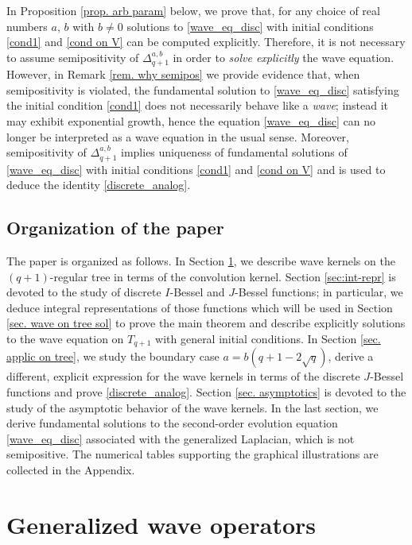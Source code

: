 \documentclass[12pt]{amsart}
\numberwithin{equation}{section}
\theoremstyle{boldremark}
\begin{document}
In Proposition \ref{prop. arb param} below, we prove that, for any choice of real numbers $a,\, b$ with $b\neq 0$ solutions to \eqref{wave_eq_disc} with initial conditions \eqref{cond1} and \eqref{cond on V} can be computed explicitly. Therefore, it is not necessary to assume semipositivity of $\Delta_{q+1}^{a,b}$ in order to \emph{solve explicitly} the wave equation. However, in Remark \ref{rem. why semipos} we provide evidence that, when semipositivity is violated, the fundamental solution to \eqref{wave_eq_disc} satisfying the initial condition \eqref{cond1} does not necessarily behave like a \emph{wave}; instead it may exhibit exponential growth, hence the equation \eqref{wave_eq_disc} can no longer be interpreted as a wave equation in the usual sense. Moreover, semipositivity of $\Delta_{q+1}^{a,b}$ implies uniqueness of fundamental solutions of \eqref{wave_eq_disc} with initial conditions \eqref{cond1} and \eqref{cond on V} and is used to deduce the identity \eqref{discrete_analog}.

\subsection{Organization of the paper}
The paper is organized as follows. In Section \ref{sec. wave on tree}, we describe wave kernels on the $(q+1)$-regular tree in terms of the convolution kernel. Section \ref{sec:int-repr} is devoted to the study of discrete $I$-Bessel and $J$-Bessel functions; in particular, we deduce integral representations of those functions which will be used in Section \ref{sec. wave on tree sol} to prove the main theorem and describe explicitly solutions to the wave equation on $T_{q+1}$ with general initial conditions. In Section \ref{sec. applic on tree}, we study the boundary case $a=b(q+1-2\sqrt{q})$, derive a different, explicit expression for the wave kernels in terms of the discrete $J$-Bessel functions and prove \eqref{discrete_analog}. Section \ref{sec. asymptotics} is devoted to the study of the asymptotic behavior of the wave kernels. In the last section, we derive fundamental solutions to the second-order evolution equation \eqref{wave_eq_disc} associated with the generalized Laplacian, which is not semipositive. The numerical tables supporting the graphical illustrations are collected in the Appendix.

\section{Generalized wave operators} \label{sec. wave on tree}
\end{document}
